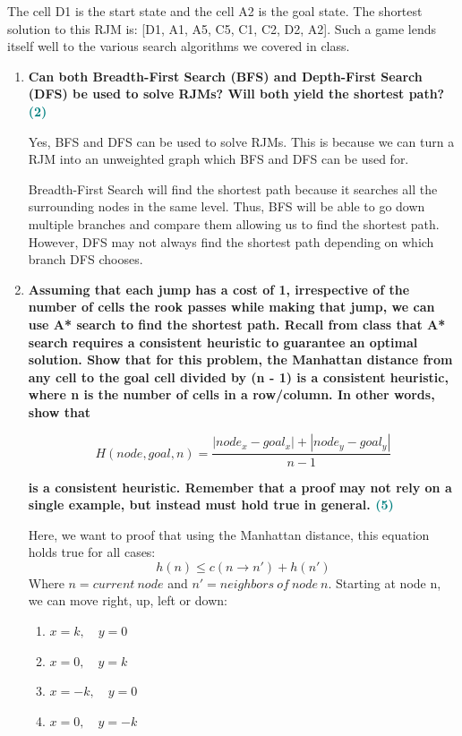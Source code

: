 \documentclass[a4paper]{article}
\begin{document}
\begin{sloppypar}
\noindent The cell D1 is the start state and the cell A2 is the goal state. The shortest solution to this
RJM is: [D1, A1, A5, C5, C1, C2, D2, A2]. Such a game lends itself well to the various
search algorithms we covered in class.

\begin{enumerate}[start=6,label=Q\arabic*,left=0pt]
    \item \textbf{Can both Breadth-First Search (BFS) and Depth-First Search (DFS) be used to solve RJMs? Will both yield the shortest path? \hfill \textcolor{teal}{(2)}}
    
    \par Yes, BFS and DFS can be used to solve RJMs. This is because we can turn a RJM into an unweighted graph which BFS and DFS 
    can be used for. 
    
    Breadth-First Search will find the shortest path because it searches all the surrounding nodes in the same level. Thus, BFS
    will be able to go down multiple branches and compare them allowing us to find the shortest path. However, DFS may not 
    always find the shortest path depending on which branch DFS chooses.

    \item \textbf{Assuming that each jump has a cost of 1, irrespective of the number of cells the rook
    passes while making that jump, we can use A* search to find the shortest path. Recall
    from class that A* search requires a consistent heuristic to guarantee an optimal solution.
    Show that for this problem, the Manhattan distance from any cell to the goal cell divided
    by (n - 1) is a consistent heuristic, where n is the number of cells in a row/column. In other words, show that}

    \[ H(node, goal, n) = \frac{|node_x - goal_x| + |node_y - goal_y|}{n - 1} \]

    \textbf{is a consistent heuristic. Remember that a proof may not rely on a single example, but instead must hold true in general. \hfill \textcolor{teal}{(5)}}
    
    \par Here, we want to proof that using the Manhattan distance, this equation holds true for all cases:
    \[ h(n) \leq c(n \rightarrow n') + h(n') \]
    Where $n = current\:node$ and $n' = neighbors\:of\:node\:n$. Starting at node n, we can move right, up, left or down:
    \begin{enumerate}[start=1,label=\arabic*.,left=0pt]
        \item $ x = k, \quad y = 0 $
        \item $ x = 0, \quad y = k $ 
        \item $ x = -k, \quad y = 0 $
        \item $ x = 0, \quad y = -k $
    \end{enumerate}


\end{enumerate}
\end{sloppypar}
\end{document}

